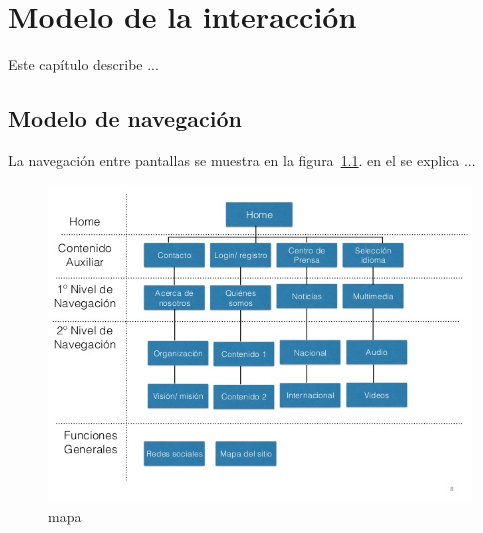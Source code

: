 \chapter{Modelo de la interacción}	
\label{cap:modInteraccion}

	Este capítulo describe ...

\section{Modelo de navegación}

	La navegación entre pantallas se muestra en la figura~\ref{fig:mapa}. en el se explica ...\\

\begin{figure}[htbp]
	\begin{center}
		\includegraphics[width=.7\textwidth]{images/mapa}
		\caption{mapa}
		\label{fig:mapa}
	\end{center}
\end{figure}



